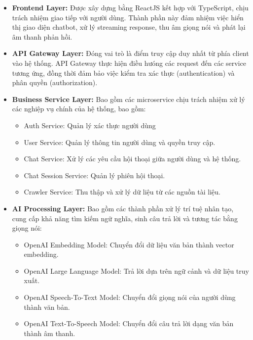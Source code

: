 \documentclass[../DoAn.tex]{subfiles}
\begin{document}
\begin{itemize}
    \item \textbf{Frontend Layer:}
          Được xây dựng bằng ReactJS kết hợp với TypeScript, chịu trách nhiệm giao tiếp với người dùng.
          Thành phần này đảm nhiệm việc hiển thị giao diện chatbot, xử lý streaming response,
          thu âm giọng nói và phát lại âm thanh phản hồi.

    \item \textbf{API Gateway Layer:}
          Đóng vai trò là điểm truy cập duy nhất từ phía client vào hệ thống.
          API Gateway thực hiện điều hưóng các request đến các service tương ứng,
          đồng thời đảm bảo việc kiểm tra xác thực (authentication) và phân quyền (authorization).

    \item \textbf{Business Service Layer:}
          Bao gồm các microservice chịu trách nhiệm xử lý các nghiệp vụ chính của hệ thống, bao gồm:
          \begin{itemize}
              \item Auth Service: Quản lý xác thực người dùng
              \item User Service: Quản lý thông tin người dùng và quyền truy cập.
              \item Chat Service: Xử lý các yêu cầu hội thoại giữa người dùng và hệ thống.
              \item Chat Session Service: Quản lý phiên hội thoại.
              \item Crawler Service: Thu thập và xử lý dữ liệu từ các nguồn tài liệu.
          \end{itemize}

    \item \textbf{AI Processing Layer:}
          Bao gồm các thành phần xử lý trí tuệ nhân tạo, cung cấp khả năng tìm kiếm ngữ nghĩa,
          sinh câu trả lời và tương tác bằng giọng nói:
          \begin{itemize}
              \item OpenAI Embedding Model: Chuyển đổi dữ liệu văn bản thành vector embedding.
              \item OpenAI Large Language Model: Trả lời dựa trên ngữ cảnh và dữ liệu truy xuất.
              \item OpenAI Speech-To-Text Model: Chuyển đổi giọng nói của người dùng thành văn bản.
              \item OpenAI Text-To-Speech Model: Chuyển đổi câu trả lời dạng văn bản thành âm thanh.
          \end{itemize}


\end{itemize}
\end{document}
